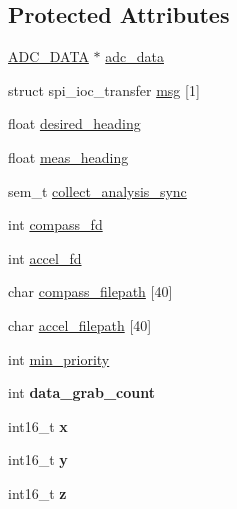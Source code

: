 \subsection*{Protected Attributes}
\begin{DoxyCompactItemize}
\item 
\hyperlink{struct__ADC__DATA}{A\-D\-C\-\_\-\-D\-A\-T\-A} $\ast$ \hyperlink{classCompass_a72a3d0e853685bdbc6758120ebd10800}{adc\-\_\-data}
\item 
struct spi\-\_\-ioc\-\_\-transfer \hyperlink{classCompass_aed40464cb0c9203d87ab8a9127cc9080}{msg} \mbox{[}1\mbox{]}
\item 
float \hyperlink{classCompass_ac888a4dacdc477e53c99fe8e110966ae}{desired\-\_\-heading}
\item 
float \hyperlink{classCompass_af0f87a131e2c9833f7d52bed1a39bf75}{meas\-\_\-heading}
\item 
sem\-\_\-t \hyperlink{classCompass_ace6e13b91461366609f093fef09188d9}{collect\-\_\-analysis\-\_\-sync}
\item 
int \hyperlink{classCompass_a44b0e4223918e3b139e54d54a0e3daad}{compass\-\_\-fd}
\item 
int \hyperlink{classCompass_a2a55ab6b29ea9ddca507a948cb30d42b}{accel\-\_\-fd}
\item 
char \hyperlink{classCompass_a6ff33d93efe79539c75dbee45efdc97c}{compass\-\_\-filepath} \mbox{[}40\mbox{]}
\item 
char \hyperlink{classCompass_a69f89e1a0d7c769e02cd3704904e40fd}{accel\-\_\-filepath} \mbox{[}40\mbox{]}
\item 
int \hyperlink{classCompass_a90f2dea7249c85f22c5bc45ed9d86b57}{min\-\_\-priority}
\item 
\hypertarget{classCompass_a08a0c0243b0c0dbfef446b7cdc6171a5}{int {\bfseries data\-\_\-grab\-\_\-count}}\label{classCompass_a08a0c0243b0c0dbfef446b7cdc6171a5}

\item 
\hypertarget{classCompass_ae19b46ed0c752445d27175c2205e2d6e}{int16\-\_\-t {\bfseries x}}\label{classCompass_ae19b46ed0c752445d27175c2205e2d6e}

\item 
\hypertarget{classCompass_a92ae0ec7df5da4f682653edc59a3902e}{int16\-\_\-t {\bfseries y}}\label{classCompass_a92ae0ec7df5da4f682653edc59a3902e}

\item 
\hypertarget{classCompass_ad69ac341e3d3e3c956658bb847f271d5}{int16\-\_\-t {\bfseries z}}\label{classCompass_ad69ac341e3d3e3c956658bb847f271d5}


\end{DoxyCompactItemize}
